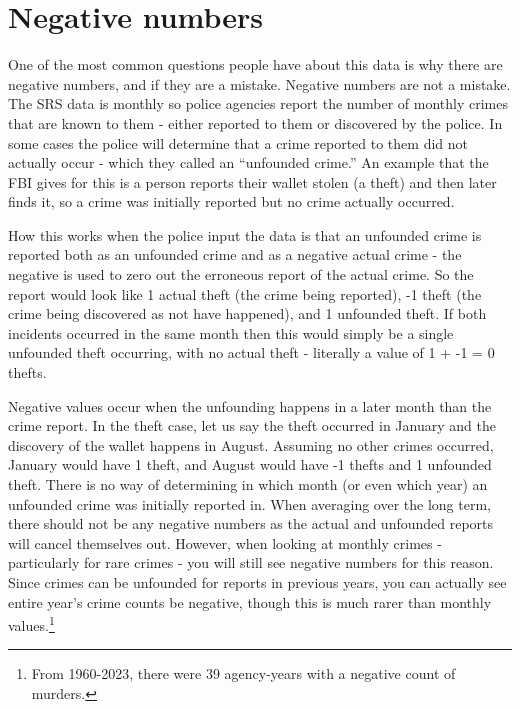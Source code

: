 \documentclass[
]{krantz}
\begin{document}
\section{Negative numbers}\label{negative-numbers}

One of the most common questions people have about this data
is why there are negative numbers, and if they are a
mistake. Negative numbers are not a mistake. The SRS data is
monthly so police agencies report the number of monthly
crimes that are known to them - either reported to them or
discovered by the police. In some cases the police will
determine that a crime reported to them did not actually
occur - which they called an ``unfounded crime.'' An example
that the FBI gives for this is a person reports their wallet
stolen (a theft) and then later finds it, so a crime was
initially reported but no crime actually occurred.

How this works when the police input the data is that an
unfounded crime is reported both as an unfounded crime and
as a negative actual crime - the negative is used to zero
out the erroneous report of the actual crime. So the report
would look like 1 actual theft (the crime being reported),
-1 theft (the crime being discovered as not have happened),
and 1 unfounded theft. If both incidents occurred in the
same month then this would simply be a single unfounded
theft occurring, with no actual theft - literally a value of
1 + -1 = 0 thefts.

Negative values occur when the unfounding happens in a later
month than the crime report. In the theft case, let us say
the theft occurred in January and the discovery of the
wallet happens in August. Assuming no other crimes occurred,
January would have 1 theft, and August would have -1 thefts
and 1 unfounded theft. There is no way of determining in
which month (or even which year) an unfounded crime was
initially reported in. When averaging over the long term,
there should not be any negative numbers as the actual and
unfounded reports will cancel themselves out. However, when
looking at monthly crimes - particularly for rare crimes -
you will still see negative numbers for this reason. Since
crimes can be unfounded for reports in previous years, you
can actually see entire year's crime counts be negative,
though this is much rarer than monthly values.\footnote{From
  1960-2023, there were 39 agency-years with a negative
  count of murders.}
\end{document}
